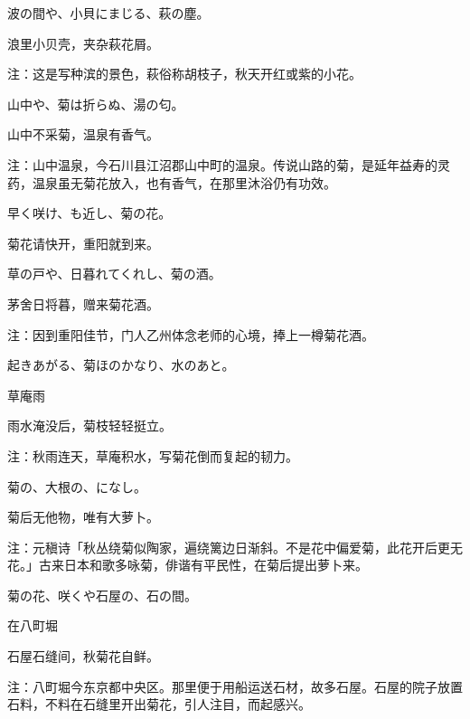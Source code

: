 \begin{haiku}
    {\FH 波の間や、小貝にまじる、萩の塵。}

    {\FK 浪里小贝壳，夹杂萩花屑。}

    {\FT 注：这是写种滨的景色，萩俗称胡枝子，秋天开红或紫的小花。}
\end{haiku}

\begin{haiku}
    {\FH 山中や、菊は折らぬ、湯の匂。}

    {\FK 山中不采菊，温泉有香气。}

    {\FT 注：山中温泉，今石川县江沼郡山中町的温泉。传说山路的菊，是延年益寿的灵药，温泉虽无菊花放入，也有香气，在那里沐浴仍有功效。}
\end{haiku}

\begin{haiku}
    {\FH 早く咲け、も近し、菊の花。}

    {\FK 菊花请快开，重阳就到来。}
\end{haiku}

\begin{haiku}
    {\FH 草の戸や、日暮れてくれし、菊の酒。}

    {\FK 茅舍日将暮，赠来菊花酒。}

    {\FT 注：因到重阳佳节，门人乙州体念老师的心境，捧上一樽菊花酒。}
\end{haiku}

\begin{haiku}
    {\FH 起きあがる、菊ほのかなり、水のあと。}

    {\FK 草庵雨}

    {\FK 雨水淹没后，菊枝轻轻挺立。}

    {\FT 注：秋雨连天，草庵积水，写菊花倒而复起的韧力。}
\end{haiku}

\begin{haiku}
    {\FH 菊の、大根の、になし。}

    {\FK 菊后无他物，唯有大萝卜。}

    {\FT 注：元稹诗「秋丛绕菊似陶家，遍绕篱边日渐斜。不是花中偏爱菊，此花开后更无花。」古来日本和歌多咏菊，俳谐有平民性，在菊后提出萝卜来。}
\end{haiku}

\begin{haiku}
    {\FH 菊の花、咲くや石屋の、石の間。}

    {\FK 在八町堀}

    {\FK 石屋石缝间，秋菊花自鲜。}

    {\FT 注：八町堀今东京都中央区。那里便于用船运送石材，故多石屋。石屋的院子放置石料，不料在石缝里开出菊花，引人注目，而起感兴。}
\end{haiku}

